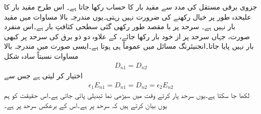 جزوی برقی مستقل کی مدد سے مقید بار کا حساب رکھا جاتا ہے۔ اس طرح مقید بار  کا علیحدہ طور پر  خیال رکھنے کی ضرورت نہیں رہتی۔یوں مندرجہ بالا مساوات میں  مقید بار نہیں ہے۔  سرحد پر با مقصد طور   رکھی گئی سطحی کثافتِ بار ہے۔اس منفرد  صورت، جہاں سرحد پر از خود بار رکھا جائے،  کے علاوہ دو ذو برق کی سرحد پر کبھی بار نہیں پایا جاتا۔انجنیئرنگ مسائل میں عموماً  ہی ہوتا ہے۔ایسی صورت میں مندرجہ بالا مساوات نسبتاً سادہ شکل 
\begin{align}\label{مساوات_کپیسٹر_عمودی_برقی_بہاو_مسلسل_ہے}
D_{n1} =D_{n2}
\end{align}
اختیار کر لیتی ہے جس سے
\begin{align}
\epsilon_{1} E_{n1}= D_{n1}=D_{n2}=\epsilon_2 E_{n2}
\end{align}
لکھا جا سکتا ہے۔یوں سرحد پار کرتے وقت  میں سیڑھی نما تبدیلی پائی جاتی ہے۔اس حقیقت کو ہم یوں بیان کرتے ہیں کہ سرحد پر   ہے۔اس کے برعکس  سرحد پر  ہے۔

